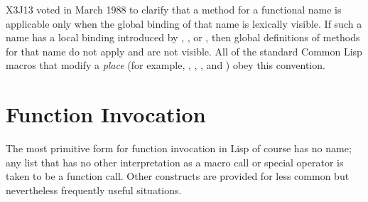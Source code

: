 \begin{newer}
X3J13 voted in March 1988 
to clarify that a  method for a functional name is applicable
only when the global binding of that name is lexically visible.
If such a name has a local binding introduced by , ,
or , then global definitions of  methods for
that name do not apply and are not visible.  All of the standard Common Lisp
macros that modify a  \emph{place} (for example,
, , , and ) obey this convention.
\end{newer}

\section{Function Invocation}

The most primitive form for function invocation in Lisp of course
has no name; any list that has no other interpretation
as a macro call or special operator is taken to be a function call.
Other constructs are provided for less common but
nevertheless frequently useful situations.

